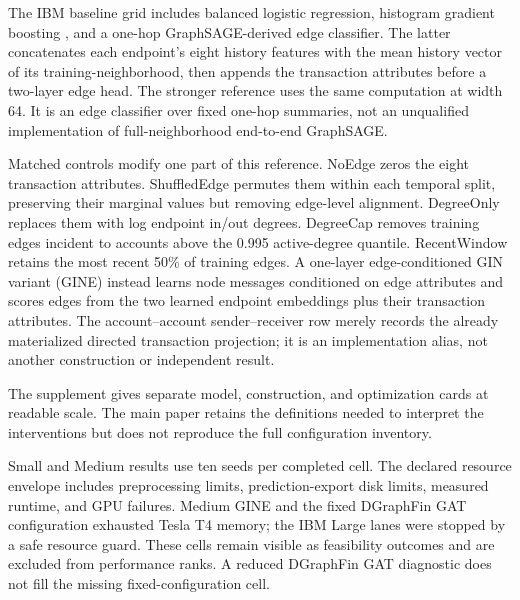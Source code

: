 The IBM baseline grid includes balanced logistic regression, histogram gradient boosting \cite{friedman2001gbm}, and a one-hop GraphSAGE-derived edge classifier. The latter concatenates each endpoint's eight history features with the mean history vector of its training-neighborhood, then appends the transaction attributes before a two-layer edge head. The stronger reference uses the same computation at width 64. It is an edge classifier over fixed one-hop summaries, not an unqualified implementation of full-neighborhood end-to-end GraphSAGE.

Matched controls modify one part of this reference. NoEdge zeros the eight transaction attributes. ShuffledEdge permutes them within each temporal split, preserving their marginal values but removing edge-level alignment. DegreeOnly replaces them with log endpoint in/out degrees. DegreeCap removes training edges incident to accounts above the 0.995 active-degree quantile. RecentWindow retains the most recent 50\% of training edges. A one-layer edge-conditioned GIN variant (GINE) \cite{hu2020pretraining} instead learns node messages conditioned on edge attributes and scores edges from the two learned endpoint embeddings plus their transaction attributes. The account--account sender--receiver row merely records the already materialized directed transaction projection; it is an implementation alias, not another construction or independent result.

The supplement gives separate model, construction, and optimization cards at readable scale. The main paper retains the definitions needed to interpret the interventions but does not reproduce the full configuration inventory.

Small and Medium results use ten seeds per completed cell. The declared resource envelope includes preprocessing limits, prediction-export disk limits, measured runtime, and GPU failures. Medium GINE and the fixed DGraphFin GAT configuration exhausted Tesla T4 memory; the IBM Large lanes were stopped by a safe resource guard. These cells remain visible as feasibility outcomes and are excluded from performance ranks. A reduced DGraphFin GAT diagnostic does not fill the missing fixed-configuration cell.
